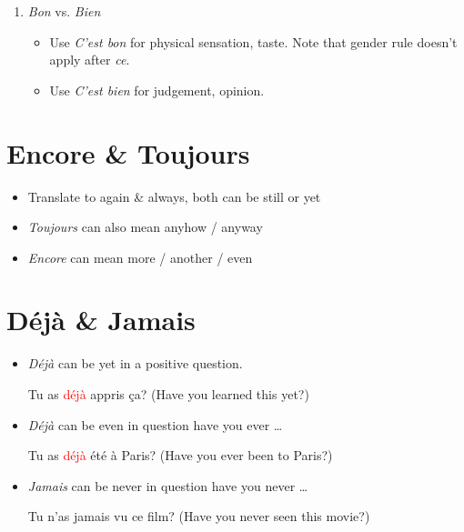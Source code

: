 \documentclass{book}
\begin{document}
\begin{enumerate}
            \item \textit{Bon} vs. \textit{Bien}
                \begin{itemize}
                    \item Use \textit{C'est bon} for physical sensation, taste. Note that gender rule doesn't apply after \textit{ce}.
                    \item Use \textit{C'est bien} for judgement, opinion.
                \end{itemize}
        \end{enumerate}

    \section{Encore \& Toujours}
        \begin{itemize}
            \item Translate to again \& always, both can be still or yet
            \item \textit{Toujours} can also mean anyhow / anyway
            \item \textit{Encore} can mean more / another / even
        \end{itemize}

    \section{Déjà \& Jamais}
        \begin{itemize}
            \item \textit{Déjà} can be yet in a positive question.
                \begin{center}
                    Tu as \textcolor{red}{déjà} appris ça? (Have you learned this yet?)
                \end{center}
            \item \textit{Déjà} can be even in question have you ever \dots
                \begin{center}
                    Tu as \textcolor{red}{déjà} été à Paris? (Have you ever been to Paris?)
                \end{center}
            \item \textit{Jamais} can be never in question have you never \dots
                \begin{center}
                    Tu n'as jamais vu ce film? (Have you never seen this movie?)
                \end{center}
        \end{itemize}
\end{document}
